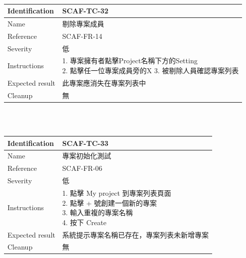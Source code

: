 \documentclass{report}
\begin{document}
\\
\begin{tabularx}{\textwidth}{
  |p{}%
  |p{}|%
  }
  \hline
  \centering Identification &  SCAF-TC-32 \\
  \hline
  \centering Name & 剔除專案成員 \\
  \hline
  \centering Reference & SCAF-FR-14 \\
  \hline
  \centering Severity & 低 \\
  \hline
  \centering Instructions & 
  \makecell[l]{
    1. 專案擁有者點擊Project名稱下方的Setting \\
    2. 點擊任一位專案成員旁的X
    3. 被剔除人員確認專案列表
  }\\
  \hline
  \centering Expected result & 此專案應消失在專案列表中 \\
  \hline
  \centering Cleanup & 無 \\
  \hline
\end{tabularx}
\\
\newline
\\
\begin{tabularx}{\textwidth}{
  |p{}%
  |p{}|%
  }
  \hline
  \centering Identification &  SCAF-TC-33 \\
  \hline
  \centering Name & 專案初始化測試 \\
  \hline
  \centering Reference & SCAF-FR-06 \\
  \hline
  \centering Severity & 低 \\
  \hline
  \centering Instructions & 
  \makecell[l]{
    1. 點擊 My project 到專案列表頁面 \\
    2. 點擊 + 號創建一個新的專案 \\
    3. 輸入重複的專案名稱 \\
    4. 按下 Create
  }\\
  \hline
  \centering Expected result & 系統提示專案名稱已存在，專案列表未新增專案 \\
  \hline
  \centering Cleanup & 無 \\
  \hline
\end{tabularx}
\\
\newline
\\
\end{document}

